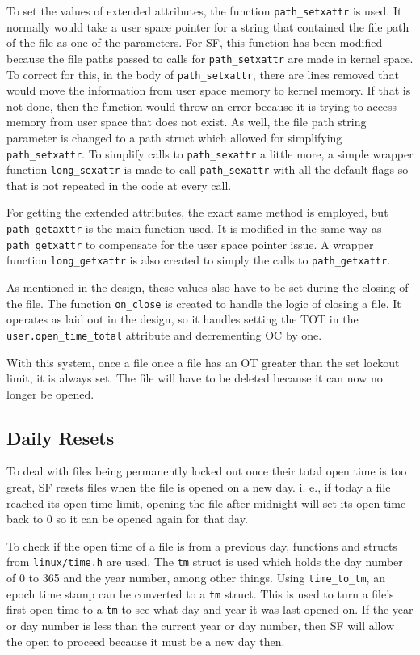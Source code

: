 To set the values of extended attributes, the function \texttt{path\_setxattr} is used. It normally would take a user space pointer for a string that contained the file path of the file as one of the parameters. For SF, this function has been modified because the file paths passed to calls for \texttt{path\_setxattr} are made in kernel space. To correct for this, in the body of \texttt{path\_setxattr}, there are lines removed that would move the information from user space memory to kernel memory. If that is not done, then the function would throw an error because it is trying to access memory from user space that does not exist. As well, the file path string parameter is changed to a path struct which allowed for simplifying \texttt{path\_setxattr}. To simplify calls to \texttt{path\_sexattr} a little more, a simple wrapper function \texttt{long\_sexattr} is made to call \texttt{path\_sexattr} with all the default flags so that is not repeated in the code at every call.

For getting the extended attributes, the exact same method is employed, but \texttt{path\_getaxttr} is the main function used. It is modified in the same way as \texttt{path\_getxattr} to compensate for the user space pointer issue. A wrapper function \texttt{long\_getxattr} is also created to simply the calls to \texttt{path\_getxattr}.

As mentioned in the design, these values also have to be set during the closing of the file. The function \texttt{on\_close} is created to handle the logic of closing a file. It operates as laid out in the design, so it handles setting the TOT in the \texttt{user.open\_time\_total} attribute and decrementing OC by one.

With this system, once a file once a file has an OT greater than the set lockout limit, it is always set. The file will have to be deleted because it can now no longer be opened.

\subsection{Daily Resets}
To deal with files being permanently locked out once their total open time is too great, SF resets files when the file is opened on a new day. i. e., if today a file reached its open time limit, opening the file after midnight will set its open time back to 0 so it can be opened again for that day.

To check if the open time of a file is from a previous day, functions and structs from \texttt{linux/time.h} are used. The \texttt{tm} struct is used which holds the day number of 0 to 365 and the year number, among other things. Using \texttt{time\_to\_tm}, an epoch time stamp can be converted to a \texttt{tm} struct. This is used to turn a file's first open time to a \texttt{tm} to see what day and year it was last opened on. If the year or day number is less than the current year or day number, then SF will allow the open to proceed because it must be a new day then.

